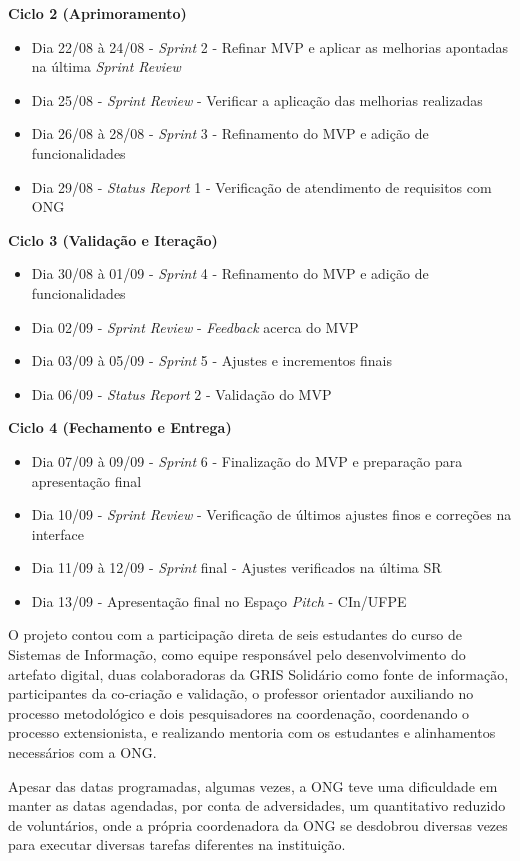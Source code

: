 \textbf{Ciclo 2 (Aprimoramento)}
    \begin{itemize}
        \item Dia 22/08 à 24/08 - \textit{Sprint} 2  - Refinar \gls{MVP} e aplicar as melhorias apontadas na última \textit{Sprint Review}
        \item Dia 25/08 - \textit{Sprint Review} - Verificar a aplicação das melhorias realizadas
        \item Dia 26/08 à 28/08 - \textit{Sprint} 3 - Refinamento do \gls{MVP} e adição de funcionalidades
        \item Dia 29/08 - \textit{Status Report} 1 - Verificação de atendimento de requisitos com \gls{ONG}
    \end{itemize}
\par\vspace{1\baselineskip}

\textbf{Ciclo 3 (Validação e Iteração)}
    \begin{itemize}
        \item Dia 30/08 à 01/09 - \textit{Sprint} 4 - Refinamento do \gls{MVP} e adição de funcionalidades
        \item Dia 02/09 - \textit{Sprint Review} - \textit{Feedback} acerca do \gls{MVP}
        \item Dia 03/09 à 05/09 - \textit{Sprint} 5 - Ajustes e incrementos finais
        \item Dia 06/09 - \textit{Status Report} 2 - Validação do \gls{MVP}
    \end{itemize}
\par\vspace{1\baselineskip}

\textbf{Ciclo 4 (Fechamento e Entrega)}
    \begin{itemize}
        \item Dia 07/09 à 09/09 - \textit{Sprint} 6 - Finalização do \gls{MVP} e preparação para apresentação final
        \item Dia 10/09 - \textit{Sprint Review} - Verificação de últimos ajustes finos e correções na interface
        \item Dia 11/09 à 12/09 - \textit{Sprint} final - Ajustes verificados na última SR
        \item Dia 13/09 - Apresentação final no Espaço \textit{Pitch} - \gls{CIn}/\gls{UFPE}
    \end{itemize}

O projeto contou com a participação direta de seis estudantes do curso de Sistemas de Informação, como equipe responsável pelo desenvolvimento do artefato digital, duas colaboradoras da GRIS Solidário como fonte de informação, participantes da co-criação e validação, o professor orientador auxiliando no processo metodológico e dois pesquisadores na coordenação, coordenando o processo extensionista, e realizando mentoria com os estudantes e alinhamentos necessários com a \gls{ONG}.

Apesar das datas programadas, algumas vezes, a \gls{ONG} teve uma dificuldade em manter as datas agendadas, por conta de adversidades, um quantitativo reduzido de voluntários, onde a própria coordenadora da \gls{ONG} se desdobrou diversas vezes para executar diversas tarefas diferentes na instituição.